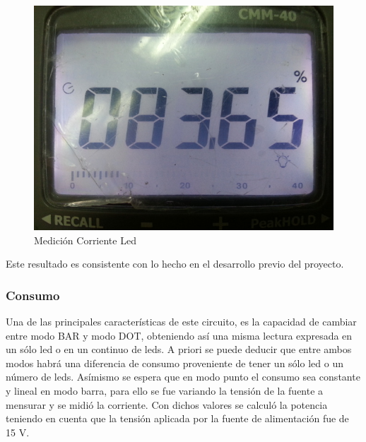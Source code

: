 \documentclass[12pt,a4paper]{article}
\begin{document}
			\begin{figure}[H]
			\centering
				\includegraphics[scale=0.5]{images/sonel.jpg}\caption{Medición Corriente Led}
			\end{figure}

			Este resultado es consistente con lo hecho en el desarrollo previo del proyecto.

			\subsubsection{Consumo}
				Una de las principales características de este circuito, es la capacidad de cambiar entre modo BAR y modo DOT, obteniendo así una misma lectura expresada en un sólo led o en un continuo de leds. A priori se puede deducir que entre ambos modos habrá una diferencia de consumo proveniente de tener un sólo led o un número de leds. Asímismo se espera que en modo punto el consumo sea constante y lineal en modo barra, para ello se fue variando la tensión de la fuente a mensurar y se midió la corriente. Con dichos valores se calculó la potencia teniendo en cuenta que la tensión aplicada por la fuente de alimentación fue de 15 V.
\end{document}
